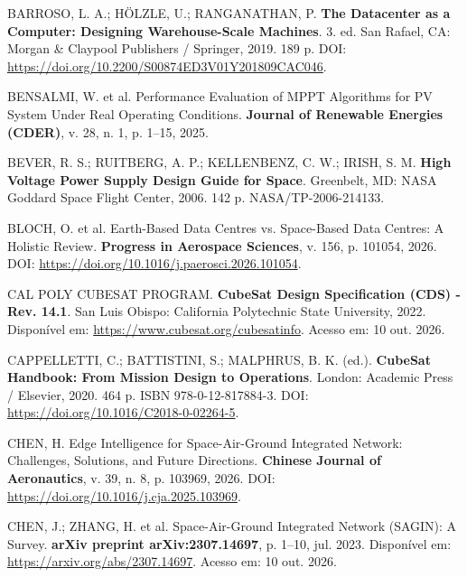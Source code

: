 \vspace{0.2cm}
\noindent BARROSO, L. A.; HÖLZLE, U.; RANGANATHAN, P. \textbf{The Datacenter as a Computer: Designing Warehouse-Scale Machines}. 3. ed. San Rafael, CA: Morgan \& Claypool Publishers / Springer, 2019. 189 p. DOI: \url{https://doi.org/10.2200/S00874ED3V01Y201809CAC046}.

\vspace{0.2cm}
\noindent BENSALMI, W. et al. Performance Evaluation of MPPT Algorithms for PV System Under Real Operating Conditions. \textbf{Journal of Renewable Energies (CDER)}, v. 28, n. 1, p. 1--15, 2025.

\vspace{0.2cm}
\noindent BEVER, R. S.; RUITBERG, A. P.; KELLENBENZ, C. W.; IRISH, S. M. \textbf{High Voltage Power Supply Design Guide for Space}. Greenbelt, MD: NASA Goddard Space Flight Center, 2006. 142 p. NASA/TP-2006-214133.

\vspace{0.2cm}
\noindent BLOCH, O. et al. Earth-Based Data Centres vs. Space-Based Data Centres: A Holistic Review. \textbf{Progress in Aerospace Sciences}, v. 156, p. 101054, 2026. DOI: \url{https://doi.org/10.1016/j.paerosci.2026.101054}.

\vspace{0.2cm}
\noindent CAL POLY CUBESAT PROGRAM. \textbf{CubeSat Design Specification (CDS) - Rev. 14.1}. San Luis Obispo: California Polytechnic State University, 2022. Disponível em: \url{https://www.cubesat.org/cubesatinfo}. Acesso em: 10 out. 2026.

\vspace{0.2cm}
\noindent CAPPELLETTI, C.; BATTISTINI, S.; MALPHRUS, B. K. (ed.). \textbf{CubeSat Handbook: From Mission Design to Operations}. London: Academic Press / Elsevier, 2020. 464 p. ISBN 978-0-12-817884-3. DOI: \url{https://doi.org/10.1016/C2018-0-02264-5}.

\vspace{0.2cm}
\noindent CHEN, H. Edge Intelligence for Space-Air-Ground Integrated Network: Challenges, Solutions, and Future Directions. \textbf{Chinese Journal of Aeronautics}, v. 39, n. 8, p. 103969, 2026. DOI: \url{https://doi.org/10.1016/j.cja.2025.103969}.

\vspace{0.2cm}
\noindent CHEN, J.; ZHANG, H. et al. Space-Air-Ground Integrated Network (SAGIN): A Survey. \textbf{arXiv preprint arXiv:2307.14697}, p. 1--10, jul. 2023. Disponível em: \url{https://arxiv.org/abs/2307.14697}. Acesso em: 10 out. 2026.

